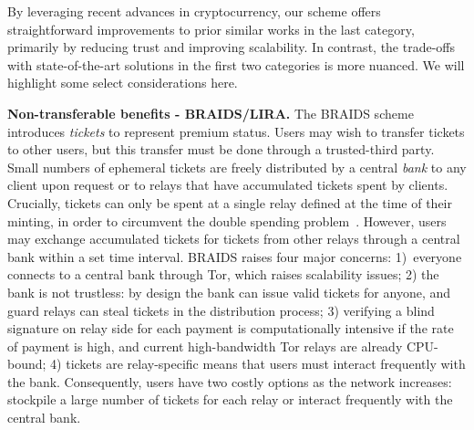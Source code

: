 

By leveraging recent advances in cryptocurrency, our scheme offers
straightforward improvements to prior similar works in the last category,
primarily by reducing trust and improving scalability. In contrast, the
trade-offs with state-of-the-art solutions in the first two categories is more
nuanced. We will highlight some select considerations here.


\medskip\noindent \textbf{Non-transferable benefits - BRAIDS/LIRA.}
%
The BRAIDS scheme
introduces \emph{tickets} to represent premium status. Users may wish to
transfer tickets to other users, but this transfer must be done through a
trusted-third party. Small numbers of ephemeral tickets are freely distributed
by a central \emph{bank} to any client upon request or to relays that have
accumulated tickets spent by clients. Crucially, tickets can only be spent at a
single relay defined at the time of their minting, in order to circumvent the
double spending problem~\cite{jansen2010recruiting}. However, users may exchange
accumulated tickets for tickets from other relays through a central bank within
a set time interval. BRAIDS raises four major concerns: 1)~everyone connects to
a central bank through Tor, which raises scalability issues; 2) the bank is not
trustless: by design the bank can issue valid tickets for anyone, and guard
relays can steal tickets in the distribution process; 3) verifying a blind
signature on relay side for each payment is computationally intensive if the
rate of payment is high, and current high-bandwidth Tor relays are already
CPU-bound; 4) tickets are relay-specific means that users must
interact frequently with the bank. Consequently, users have two costly options
as the network increases: stockpile a large number of tickets for each relay or
interact frequently with the central bank.

